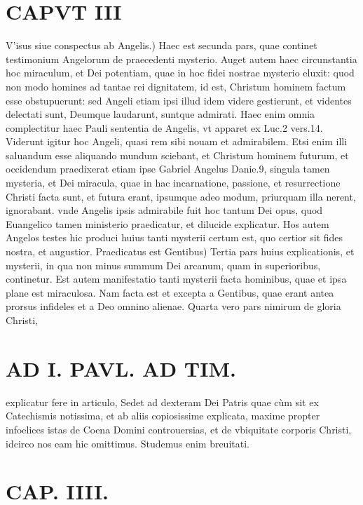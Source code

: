 \documentclass{article}
\begin{document}
\begin{pages}
\section*{CAPVT  III }
\marginpar{[ p.181 ]}\pstart V'isus siue conspectus ab Angelis.) Haec est secunda pars, quae continet testimonium Angelorum de praecedenti mysterio. Auget autem haec circunstantia hoc miraculum, et Dei potentiam, quae in hoc fidei nostrae mysterio eluxit: quod non modo homines ad tantae rei dignitatem, id est, Christum hominem factum esse obstupuerunt: sed Angeli etiam ipsi illud idem videre gestierunt, et videntes delectati sunt, Deumque laudarunt, suntque admirati. Haec enim omnia complectitur haec Pauli sententia de Angelis, vt apparet ex Luc.2 vers.14. Viderunt igitur hoc Angeli, quasi rem sibi nouam et admirabilem. Etsi enim illi saluandum esse aliquando mundum sciebant, et Christum hominem futurum, et occidendum praedixerat etiam ipse Gabriel Angelus Danie.9, singula tamen mysteria, et Dei miracula, quae in hac incarnatione, passione, et resurrectione Christi facta sunt, et futura erant, ipsumque adeo modum, priurquam illa nerent, ignorabant. vnde Angelis ipsis admirabile fuit hoc tantum Dei opus, quod Euangelico tamen ministerio praedicatur, et dilucide explicatur. Hos autem Angelos testes hic produci huius tanti mysterii certum est, quo certior sit fides nostra, et augustior.  \pend\pstart Praedicatus est Gentibus) Tertia pars huius explicationis, et mysterii, in qua non minus summum Dei arcanum, quam in superioribus, continetur. Est autem manifestatio tanti mysterii facta hominibus, quae et ipsa plane est miraculosa. Nam facta est et excepta a Gentibus, quae erant antea prorsus infideles et a Deo omnino alienae.  \pend\pstart Quarta vero pars nimirum de gloria Christi,  \pend
\section*{AD I. PAVL. AD TIM. }
\marginpar{[ p.180 ]}\pstart explicatur fere in articulo, Sedet ad dexteram Dei Patris quae cùm sit ex Catechismis notissima, et ab aliis copiosissime explicata, maxime propter infoelices istas de Coena Domini controuersias, et de vbiquitate corporis Christi, idcirco nos eam hic omittimus. Studemus enim breuitati.  \pend
\endnumbering\beginnumbering\section{CAP. IIII.}
{}

\end{pages}
\end{document}
